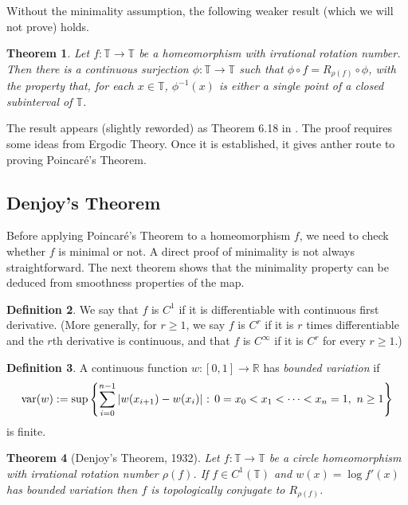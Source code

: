 \documentclass[12pt]{article}
\newtheorem{theorem}{Theorem}[section]
\theoremstyle{definition}
\newtheorem{definition}[theorem]{Definition}
\theoremstyle{remark}
\begin{document}
\medskip
Without the minimality assumption, the following weaker result (which we will not prove) holds.

\begin{theorem}\label{irr_sc_rotation}
Let $f : \mathbb T \to \mathbb T$ be a homeomorphism with irrational rotation number.
Then there is a continuous surjection $\phi : \mathbb T \to \mathbb T$ 
such that $\phi \circ f = R_{\rho(f)} \circ \phi$, with the property that, for each $x \in \mathbb T$,
$\phi^{-1}(x)$ is either a single point of a closed subinterval of $\mathbb T$.
\end{theorem}

The result appears (slightly reworded) as Theorem 6.18 in \cite{Walters}. 
The proof requires some ideas from Ergodic Theory. Once it is established, it gives anther route to proving Poincar\'e's Theorem.

\subsection{Denjoy's Theorem}
Before applying Poincar\'e's Theorem to a
homeomorphism $f$, we need to check whether $f$ is minimal or not. A direct proof
of minimality is not always straightforward. The next theorem shows that
the minimality property can be deduced from smoothness properties of the map.



\begin{definition} \label{cr}
We say that $f$ is $C^1$ if it is differentiable with continuous first derivative.
(More generally, for $r \ge1$, we say $f$ is $C^r$ if it is $r$ times differentiable and the
$r$th derivative is continuous, and that $f$ is $C^\infty$ if it is $C^r$ for every $r \ge 1$.)
\end{definition}

\begin{definition} \label{bounded_variation}
A continuous function $w : [0,1] \to \mathbb R$ has {\it bounded variation} if
\[
\mathrm{var}(w) := 
\sup\left\{\sum_{i=0}^{n-1} |w(x_{i+1})-w(x_i)|
\hbox{ : } 0=x_0 <x_1 < \cdots < x_n =1,
\ n \ge 1\right\}
\]
is finite.
\end{definition}

\begin{theorem} [Denjoy's Theorem, 1932]
Let $f : \mathbb T \to \mathbb T$ be a circle homeomorphism with irrational rotation number $\rho(f)$.
If $f \in C^1(\mathbb T)$ and $w(x) = \log f'(x)$ has bounded variation then $f$ is topologically conjugate
to $R_{\rho(f)}$.
\end{theorem}
\end{document}

